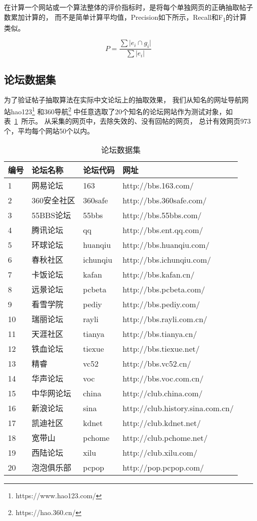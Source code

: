在计算一个网站或一个算法整体的评价指标时，是将每个单独网页的正确抽取帖子数累加计算的，
而不是简单计算平均值，Precision如下所示，Recall和F\textsubscript{1}的计算类似。

\begin{equation}
P = \frac{\sum \vert e_i \cap g_i \vert}{\sum \vert e_i \vert}
\end{equation}

\subsection{论坛数据集}
为了验证帖子抽取算法在实际中文论坛上的抽取效果，
我们从知名的网址导航网站hao123\footnote{https://www.hao123.com/}
和360导航\footnote{https://hao.360.cn/}
中任意选取了20个知名的论坛网站作为测试对象，如表~\ref{tbl:forum-dataset}~所示。
从采集的网页中，去除失效的、没有回帖的网页，
总计有效网页973个，平均每个网站50个以内。

\begin{table}[t]
\caption{论坛数据集}
\label{tbl:forum-dataset}
\vspace{0.5em}\centering\wuhao
\begin{tabular}{llll}
\toprule[1.5pt]
编号 & 论坛名称 & 论坛代码 & 网址 \\
\midrule[1pt]
1 & 网易论坛 & 163 & http://bbs.163.com/ \\
2 & 360安全社区 & 360safe & http://bbs.360safe.com/ \\
3 & 55BBS论坛 & 55bbs & http://bbs.55bbs.com/ \\
4 & 腾讯论坛 & qq & http://bbs.ent.qq.com/ \\
5 & 环球论坛 & huanqiu & http://bbs.huanqiu.com/ \\
6 & 春秋社区 & ichunqiu & http://bbs.ichunqiu.com/ \\
7 & 卡饭论坛 & kafan & http://bbs.kafan.cn/ \\
8 & 远景论坛 & pcbeta & http://bbs.pcbeta.com/ \\
9 & 看雪学院 & pediy & http://bbs.pediy.com/ \\
10 & 瑞丽论坛 & rayli & http://bbs.rayli.com.cn/ \\
11 & 天涯社区 & tianya & http://bbs.tianya.cn/ \\
12 & 铁血论坛 & tiexue & http://bbs.tiexue.net/ \\
13 & 精睿 & vc52 & http://bbs.vc52.cn/ \\
14 & 华声论坛 & voc & http://bbs.voc.com.cn/ \\
15 & 中华网论坛 & china & http://club.china.com/ \\
16 & 新浪论坛 & sina & http://club.history.sina.com.cn/ \\
17 & 凯迪社区 & kdnet & http://club.kdnet.net/ \\
18 & 宽带山 & pchome & http://club.pchome.net/ \\
19 & 西陆论坛 & xilu & http://club.xilu.com/ \\
20 & 泡泡俱乐部 & pcpop & http://pop.pcpop.com/ \\
\bottomrule[1.5pt]
\end{tabular}
\end{table}

